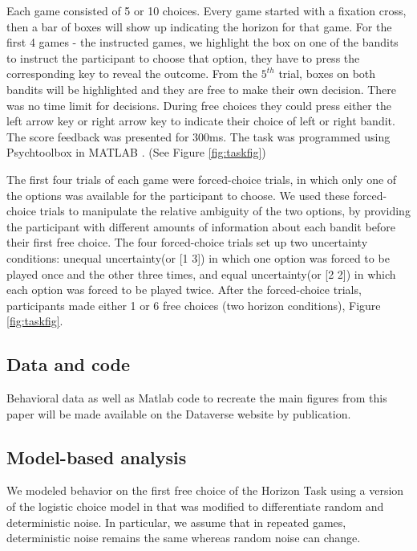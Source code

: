 \documentclass[12pt]{article}
\begin{document}
	Each game consisted of 5 or 10 choices. Every game started with a fixation cross, then a bar of boxes will show up indicating the horizon for that game. For the first 4 games - the instructed games, we highlight the box on one of the bandits to instruct the participant to choose that option, they have to press the corresponding key to reveal the outcome. From the $5^{th}$ trial, boxes on both bandits will be highlighted and they are free to make their own decision. There was no time limit for decisions. During free choices they could press either the left arrow key or right arrow key to indicate their choice of left or right bandit. The score feedback was presented for 300ms. The task was programmed using Psychtoolbox in MATLAB \citep{psychtoolbox1, psychtoolbox2}. (See Figure \ref{fig:taskfig})
	
	The first four trials of each game were forced-choice trials, in which only one of the options was available for the participant to choose. We used these forced-choice trials to manipulate the relative ambiguity of the two options, by providing the participant with different amounts of information about each bandit before their first free choice. The four forced-choice trials set up two uncertainty conditions: unequal uncertainty(or [1 3]) in which one option was forced to be played once and the other three times, and equal uncertainty(or [2 2]) in which each option was forced to be played twice. After the forced-choice trials, participants made either 1 or 6 free choices (two horizon conditions),  Figure \ref{fig:taskfig}.
	
	\subsection*{Data and code}
	Behavioral data as well as Matlab code to recreate the main figures from this paper will be made available on the Dataverse website by publication. %
	
	
	\subsection*{Model-based analysis}
	We modeled behavior on the first free choice of the Horizon Task using a version of the logistic choice model in \citep{wilson2014} that was modified to differentiate random and deterministic noise. In particular, we assume that in repeated games, deterministic noise remains the same whereas random noise can change. 
	
\end{document}
